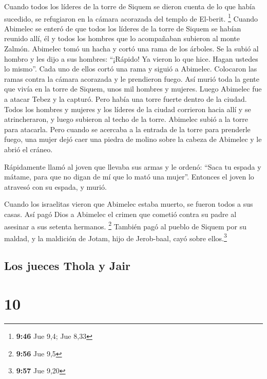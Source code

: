  Cuando todos los líderes de la torre de Siquem se dieron
cuenta de lo que había sucedido, se refugiaron en la cámara acorazada
del templo de El-berit. \footnote{\textbf{9:46} Jue 9,4; Jue 8,33}
 Cuando Abimelec se enteró de que todos los líderes de la
torre de Siquem se habían reunido allí,  él y todos los
hombres que lo acompañaban subieron al monte Zalmón. Abimelec tomó un
hacha y cortó una rama de los árboles. Se la subió al hombro y les dijo
a sus hombres: ``¡Rápido! Ya vieron lo que hice. Hagan ustedes lo
mismo''.  Cada uno de ellos cortó una rama y siguió a
Abimelec. Colocaron las ramas contra la cámara acorazada y le prendieron
fuego. Así murió toda la gente que vivía en la torre de Siquem, unos mil
hombres y mujeres.  Luego Abimelec fue a atacar Tebez y
la capturó.  Pero había una torre fuerte dentro de la
ciudad. Todos los hombres y mujeres y los líderes de la ciudad corrieron
hacia allí y se atrincheraron, y luego subieron al techo de la torre.
 Abimelec subió a la torre para atacarla. Pero cuando se
acercaba a la entrada de la torre para prenderle fuego, 
una mujer dejó caer una piedra de molino sobre la cabeza de Abimelec y
le abrió el cráneo.

 Rápidamente llamó al joven que llevaba sus armas y le
ordenó: ``Saca tu espada y mátame, para que no digan de mí que lo mató
una mujer''. Entonces el joven lo atravesó con su espada, y murió.

 Cuando los israelitas vieron que Abimelec estaba muerto,
se fueron todos a sus casas.  Así pagó Dios a Abimelec el
crimen que cometió contra su padre al asesinar a sus setenta hermanos.
\footnote{\textbf{9:56} Jue 9,5}  También pagó al pueblo
de Siquem por su maldad, y la maldición de Jotam, hijo de Jerob-baal,
cayó sobre ellos.\footnote{\textbf{9:57} Jue 9,20}

\hypertarget{los-jueces-thola-y-jair}{%
\subsection{Los jueces Thola y Jair}\label{los-jueces-thola-y-jair}}

\hypertarget{section-9}{%
\section{10}\label{section-9}}

